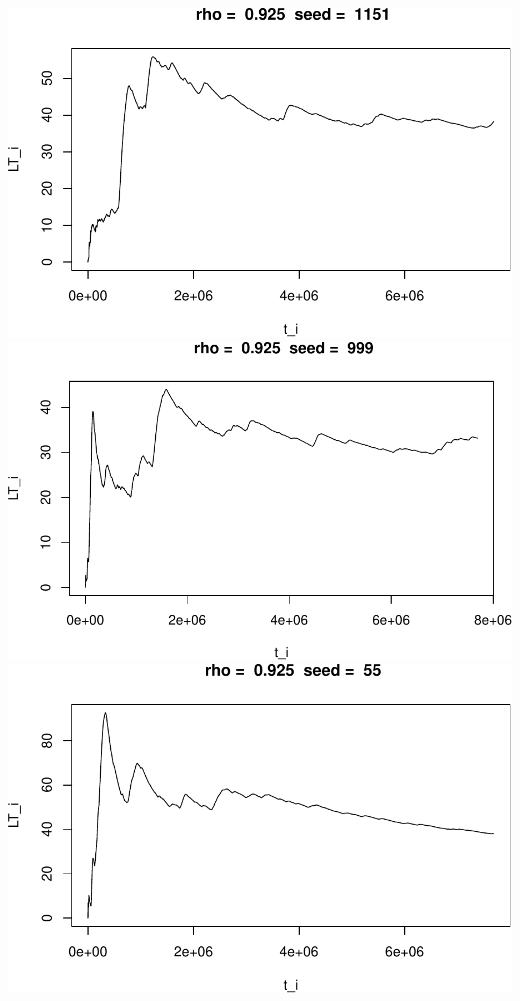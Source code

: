 \documentclass[]{article}
\begin{document}
\includegraphics{003_files/figure-latex/unnamed-chunk-23-4.pdf}
\includegraphics{003_files/figure-latex/unnamed-chunk-23-5.pdf}
\includegraphics{003_files/figure-latex/unnamed-chunk-23-6.pdf}
\end{document}
